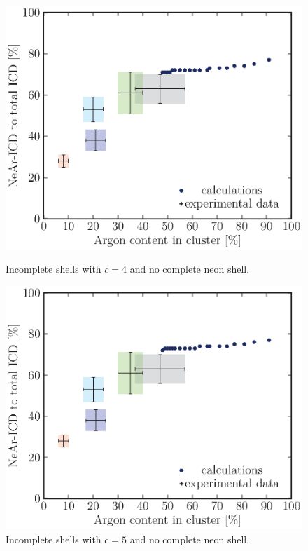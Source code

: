 \begin{figure}[!h]
\begin{minipage}{0.48\textwidth}
    \centering
    \includegraphics[scale=0.5]{pics/incompl00_04.ps}
    \caption{Incomplete shells with $c=4$ and no complete neon shell.}
    \label{incompl00_04}
\end{minipage}
\hfill
\begin{minipage}{0.48\textwidth}
    \centering
    \includegraphics[scale=0.5]{pics/incompl00_05.ps}
    \caption{Incomplete shells with $c=5$ and no complete neon shell.}
    \label{incompl00_05}
\end{minipage}
\end{figure}

